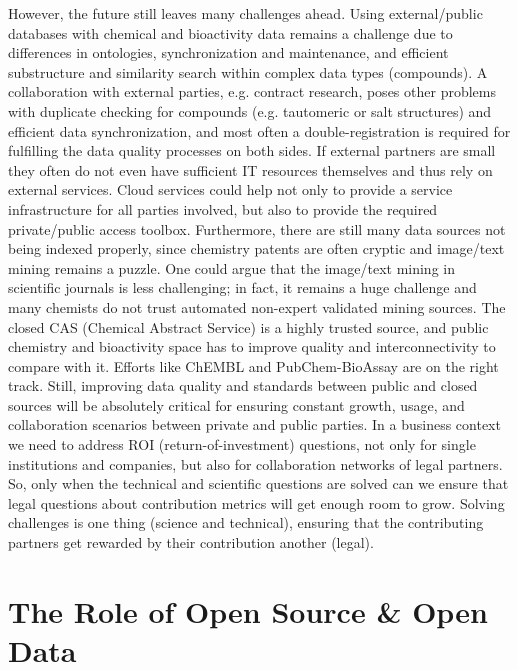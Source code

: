 \documentclass{sig-alternate}
\begin{document}
However, the future still leaves many challenges ahead. Using external/public databases
with chemical and bioactivity data remains a challenge due to differences in
ontologies, synchronization and maintenance, and efficient
substructure and similarity search within complex data types
(compounds). A
collaboration with external parties, e.g. contract research, poses other
problems with duplicate checking for compounds (e.g. tautomeric or salt
structures) and efficient data synchronization, and most often a double-registration is
required for fulfilling the data quality processes on both sides. If external
partners are small they often do not even have sufficient IT resources
themselves and thus rely on external services. Cloud services could help
not only to provide a service infrastructure for all parties involved,
but also to provide the required private/public access toolbox. Furthermore,
there are still many data sources not being indexed properly, since chemistry
patents are often cryptic and image/text mining remains a puzzle. One could
argue that the image/text mining in scientific journals is less challenging; in
fact, it remains a huge challenge and many chemists do not trust automated
non-expert validated mining sources. The closed CAS (Chemical Abstract Service)
is a highly trusted source, and public chemistry and bioactivity space has to
improve quality and interconnectivity to compare with it. Efforts like ChEMBL and PubChem-BioAssay
are on the right track. Still, improving data quality and standards between
public and closed sources will be absolutely critical for ensuring constant
growth, usage, and collaboration scenarios between private and public parties.
In a business context we need to address ROI (return-of-investment) questions, not only for single
institutions and companies, but also for collaboration networks of legal partners.
So, only when the technical and scientific questions are solved can we ensure that
legal questions about contribution metrics will get enough room to grow. Solving challenges is one thing (science and technical),
ensuring that the contributing partners get rewarded by their contribution another (legal).

\section{The Role of Open Source \& Open Data}
\label{sec:role-open-source}
\end{document}

